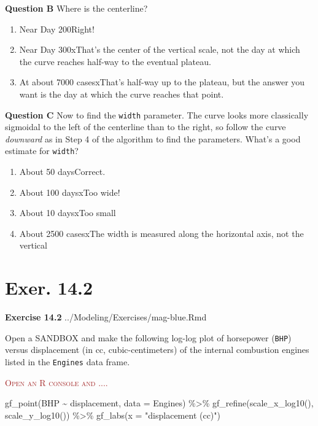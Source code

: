 \documentclass[
  letterpaper,
  DIV=11,
  numbers=noendperiod,
  oneside]{article}
\newenvironment{Shaded}{\begin{snugshade}}{\end{snugshade}}
\newcommand{\AttributeTok}[1]{\textcolor[rgb]{0.40,0.45,0.13}{#1}}
\newcommand{\FunctionTok}[1]{\textcolor[rgb]{0.28,0.35,0.67}{#1}}
\newcommand{\NormalTok}[1]{\textcolor[rgb]{0.00,0.23,0.31}{#1}}
\newcommand{\SpecialCharTok}[1]{\textcolor[rgb]{0.37,0.37,0.37}{#1}}
\newcommand{\StringTok}[1]{\textcolor[rgb]{0.13,0.47,0.30}{#1}}
\providecommand{\tightlist}{%
  \setlength{\itemsep}{0pt}\setlength{\parskip}{0pt}}\usepackage{longtable,booktabs,array}
\newenvironment{scaffolding}%
{%
\textcolor{brown}{\hrulefill}%
  \par\vspace{.3\baselineskip}%
  \textcolor{brown}{\scshape Open an R console and ....}%
  \par\vspace{\baselineskip}%
}%
{\textcolor{brown}{\hrulefill}}
\begin{document}
\begin{multicols}{2}
\textbf{Question B} Where is the centerline?

\begin{enumerate}
\def\labelenumi{\roman{enumi}.}
\tightlist
\item
  {Near Day 200{Right!~}}\\
\item
  {Near Day 300{xThat's the center of the vertical scale, not the day
  at which the curve reaches half-way to the eventual plateau.}}\\
\item
  {At about 7000 cases{xThat's half-way up to the plateau, but the
  answer you want is the day at which the curve reaches that point.}}
\end{enumerate}

\textbf{Question C} Now to find the \texttt{width} parameter. The curve
looks more classically sigmoidal to the left of the centerline than to
the right, so follow the curve \emph{downward} as in Step 4 of the
algorithm to find the parameters. What's a good estimate for
\texttt{width}?

\begin{enumerate}
\def\labelenumi{\roman{enumi}.}
\tightlist
\item
  {About 50 days{Correct.~}}\\
\item
  {About 100 days{xToo wide!}}\\
\item
  {About 10 days{xToo small}}\\
\item
  {About 2500 cases{xThe width is measured along the horizontal axis,
  not the vertical}}
\end{enumerate}

\hypertarget{exer.-14.2}{%
\section*{Exer. 14.2}\label{exer.-14.2}}

\textbf{Exercise 14.2} ../Modeling/Exercises/mag-blue.Rmd

Open a SANDBOX and make the following log-log plot of horsepower
(\texttt{BHP}) versus displacement (in cc, cubic-centimeters) of the
internal combustion engines listed in the \texttt{Engines} data frame.

\begin{scaffolding}

\begin{Shaded}
\begin{Highlighting}[]
\FunctionTok{gf\_point}\NormalTok{(BHP }\SpecialCharTok{\textasciitilde{}}\NormalTok{ displacement, }\AttributeTok{data =}\NormalTok{ Engines) }\SpecialCharTok{\%\textgreater{}\%}
  \FunctionTok{gf\_refine}\NormalTok{(}\FunctionTok{scale\_x\_log10}\NormalTok{(), }\FunctionTok{scale\_y\_log10}\NormalTok{()) }\SpecialCharTok{\%\textgreater{}\%}
  \FunctionTok{gf\_labs}\NormalTok{(}\AttributeTok{x =} \StringTok{"displacement (cc)"}\NormalTok{)}
\end{Highlighting}
\end{Shaded}


\end{scaffolding}
\end{multicols}
\end{document}
